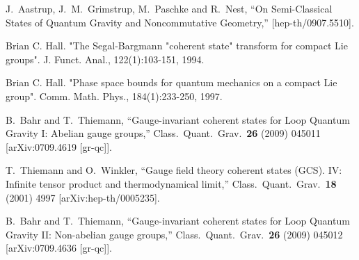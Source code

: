 \documentclass[12pt]{article}
\begin{document}
\begin{thebibliography}{99}
  J.~Aastrup, J.~M.~Grimstrup, M.~Paschke and R.~Nest,
  ``On Semi-Classical States of Quantum Gravity and Noncommutative Geometry,''
  [hep-th/0907.5510].














  
  
  
  
 

  



















Brian C. Hall. "The Segal-Bargmann "coherent state" transform for compact Lie groups". J. Funct. Anal., 122(1):103-151, 1994.

Brian C. Hall. "Phase space bounds for quantum mechanics on a compact Lie group". Comm. Math. Phys., 184(1):233-250, 1997.







  B.~Bahr and T.~Thiemann,
  ``Gauge-invariant coherent states for Loop Quantum Gravity I: Abelian gauge
  groups,''
  Class.\ Quant.\ Grav.\  {\bf 26} (2009) 045011
  [arXiv:0709.4619 [gr-qc]].


  T.~Thiemann and O.~Winkler,
  ``Gauge field theory coherent states (GCS). IV: Infinite tensor product  and
  thermodynamical limit,''
  Class.\ Quant.\ Grav.\  {\bf 18} (2001) 4997
  [arXiv:hep-th/0005235].


  B.~Bahr and T.~Thiemann,
  ``Gauge-invariant coherent states for Loop Quantum Gravity II: Non-abelian
  gauge groups,''
  Class.\ Quant.\ Grav.\  {\bf 26} (2009) 045012
  [arXiv:0709.4636 [gr-qc]].






\end{thebibliography}
\end{document}
